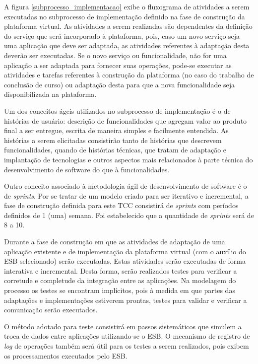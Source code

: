 A figura \ref{subprocesso_implementacao} exibe o fluxograma de atividades a serem executadas no subprocesso de implementação definido na fase de construção da plataforma virtual. As atividades a serem realizadas são dependentes da definição do serviço que será incorporado à plataforma, pois, caso um novo serviço seja uma aplicação que deve ser adaptada, as atividades referentes à adaptação desta deverão ser executadas. Se o novo serviço ou funcionalidade, não for uma aplicação a ser adaptada para fornecer suas operações, pode-se executar as atividades e tarefas referentes à construção da plataforma (no caso do trabalho de conclusão de curso) ou adaptação desta para que a nova funcionalidade seja disponibilizada na plataforma.

Um dos conceitos ágeis utilizados no subprocesso de implementação é o de histórias de usuário: descrição de funcionalidades que agregam valor ao produto final a ser entregue, escrita de maneira simples e facilmente entendida. As histórias a serem elicitadas consistirão tanto de histórias que descrevem funcionalidades, quando de histórias técnicas, que tratam de adaptação e implantação de tecnologias e outros aspectos mais relacionados à parte técnica do desenvolvimento de software do que à funcionalidades.

Outro conceito associado à metodologia ágil de desenvolvimento de software é o de \textit{sprints}. Por se tratar de um modelo criado para ser iterativo e incremental, a fase de construção definida para este TCC consistirá de \textit{sprints} com períodos definidos de 1 (uma) semana. Foi estabelecido que a quantidade de \textit{sprints} será de 8 a 10.

Durante a fase de construção em que as atividades de adaptação de uma aplicação existente e de implementação da plataforma virtual (com o auxílio do ESB selecionado) serão executadas. Estas atividades serão executadas de forma interativa e incremental. Desta forma, serão realizados testes para verificar a corretude e completude da integração entre as aplicações. Na modelagem do processo os testes se encontram implícitos, pois à medida em que partes das adaptações e implementações estiverem prontas, testes para validar e verificar a comunicação serão executados.

O método adotado para teste consistirá em passos sistemáticos que simulem a troca de dados entre aplicações utilizando-se o ESB. O mecanismo de registro de \textit{log} de operações também será útil para os testes a serem realizados, pois exibem os processamentos executados pelo ESB.

